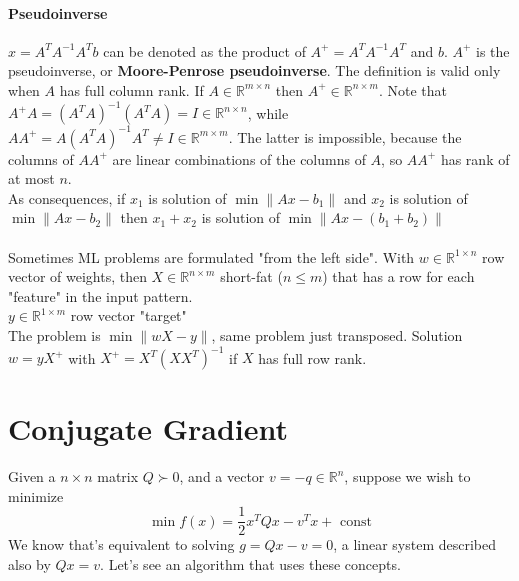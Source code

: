 \documentclass[10pt]{report}
\begin{document}
\paragraph{Pseudoinverse} $x = A^TA^{-1}A^Tb$ can be denoted as the product of $A^+ = A^TA^{-1}A^T$ and $b$. $A^+$ is the pseudoinverse, or \textbf{Moore-Penrose pseudoinverse}. The definition is valid only when $A$ has full column rank. If $A\in \mathbb{R}^{m\times n}$ then $A^+ \in \mathbb{R}^{n\times m}$. Note that $A^+A = (A^TA)^{-1}(A^TA) = I\in \mathbb{R}^{n\times n}$, while $AA^+ = A(A^TA)^{-1}A^T \neq I\in \mathbb{R}^{m\times m}$. The latter is impossible, because the columns of $AA^+$ are linear combinations of the columns of $A$, so $AA^+$ has rank of at most $n$.\\
As consequences, if $x_1$ is solution of $\min\|Ax - b_1\|$ and $x_2$ is solution of $\min\|Ax - b_2\|$ then $x_1+x_2$ is solution of $\min\|Ax - (b_1 + b_2)\|$\\\\Sometimes ML problems are formulated "from the left side". With $w\in \mathbb{R}^{1\times n}$ row vector of weights, then $X\in \mathbb{R}^{n\times m}$ short-fat ($n\leq m$) that has a row for each "feature" in the input pattern.\\
$y \in \mathbb{R}^{1\times m}$ row vector "target"\\
The problem is $\min\|wX - y\|$, same problem just transposed. Solution $w = yX^+$ with $X^+ = X^T(XX^T)^{-1}$ if $X$ has full row rank.
\pagebreak
\section{Conjugate Gradient}
Given a $n\times n$ matrix $Q\succ 0$, and a vector $v = -q\in\mathbb{R}^n$, suppose we wish to minimize $$\min f(x) = \frac{1}{2}x^TQx-v^Tx+\text{ const}$$
We know that's equivalent to solving $g = Qx-v = 0$, a linear system described also by $Qx = v$. Let's see an algorithm that uses these concepts.
\end{document}
